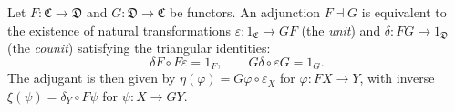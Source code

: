 Let $F : \mathfrak{C} \to \mathfrak{D}$ and $G : \mathfrak{D} \to \mathfrak{C}$ be functors. An adjunction $F \dashv G$ is equivalent to the existence of natural transformations $\varepsilon : 1_{\mathfrak{C}} \to GF$ (the \textit{unit}) and $\delta : FG \to 1_{\mathfrak{D}}$ (the \textit{counit}) satisfying the triangular identities:
$$
\delta F \circ F \varepsilon = 1_F, \qquad G \delta \circ \varepsilon G = 1_G.
$$
The adjugant is then given by $\eta(\varphi) = G\varphi \circ \varepsilon_X$ for $\varphi : FX \to Y$, with inverse $\xi(\psi) = \delta_Y \circ F\psi$ for $\psi : X \to GY$.
